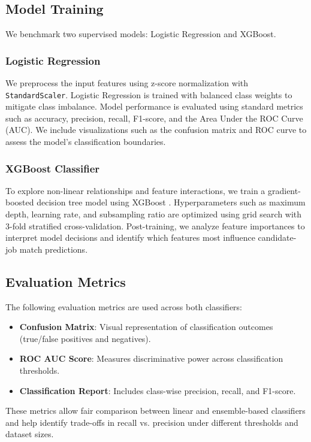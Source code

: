 \documentclass[a4paper]{article}
\begin{document}
\begin{multicols}{2}
\subsection{Model Training}
We benchmark two supervised models: Logistic Regression and XGBoost.

\subsubsection{Logistic Regression}
We preprocess the input features using z-score normalization with \texttt{StandardScaler}. Logistic Regression is trained with balanced class weights to mitigate class imbalance. Model performance is evaluated using standard metrics such as accuracy, precision, recall, F1-score, and the Area Under the ROC Curve (AUC). We include visualizations such as the confusion matrix and ROC curve to assess the model's classification boundaries.

\subsubsection{XGBoost Classifier}
To explore non-linear relationships and feature interactions, we train a gradient-boosted decision tree model using XGBoost \cite{7}. Hyperparameters such as maximum depth, learning rate, and subsampling ratio are optimized using grid search with 3-fold stratified cross-validation. Post-training, we analyze feature importances to interpret model decisions and identify which features most influence candidate-job match predictions.

\subsection{Evaluation Metrics}
The following evaluation metrics are used across both classifiers:
\begin{itemize}
    \item \textbf{Confusion Matrix}: Visual representation of classification outcomes (true/false positives and negatives).
    \item \textbf{ROC AUC Score}: Measures discriminative power across classification thresholds.
    \item \textbf{Classification Report}: Includes class-wise precision, recall, and F1-score.
\end{itemize}

These metrics allow fair comparison between linear and ensemble-based classifiers and help identify trade-offs in recall vs. precision under different thresholds and dataset sizes.





\end{multicols}
\end{document}
